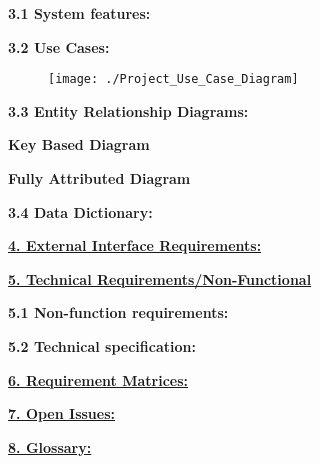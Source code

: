 \documentclass[12pt]{article}
\begin{document}
		\textbf{3.1 System features:} %
		\vspace{0.1in}
		
		
	\vspace{0.2in}
	
		\textbf{3.2 Use Cases:} %
		\vspace{0.1in}
			\begin{figure}[htbp] %
				\centering
				\texttt{[image: ./Project\_Use\_Case\_Diagram]}
			\end{figure}
		
		
		
	\vspace{0.2in}
	
		\textbf{3.3 Entity Relationship Diagrams:}
		\vspace{0.2in}
		

		\vspace{0.1in}

			\begin{center}
			\textbf{Key Based Diagram}
			\end{center}
		
		\vspace{0.3in}
		
		
		\begin{center}
			\textbf{Fully Attributed Diagram}
			\end{center}
		
		\vspace{0.3in}
		
		

		
	\vspace{0.1in}
	
		\textbf{3.4 Data Dictionary:}
		\vspace{0.1in}
		
		
	\vspace{0.5in}
	
	\textbf{\underline{4. External Interface Requirements:}}
	\vspace{0.2in}
	
	
	
	\vspace{0.5in}
	
	\textbf{\underline{5. Technical Requirements/Non-Functional}}
	\vspace{0.2in}
	
		\textbf{5.1 Non-function requirements:} %
		\vspace{0.1in}
				
		\textbf{5.2 Technical specification:} %
		\vspace{0.1in}
	
	\vspace{0.5in}
	
	\newpage
	\textbf{\underline{6. Requirement Matrices:}}
	\vspace{0.2in}
	
	
	
	\vspace{0.5in}
	
	\textbf{\underline{7. Open Issues:}}		
	\vspace{0.2in}
	
	
	
	\vspace{0.5in}
	
	\textbf{\underline{8. Glossary:}}
	\vspace{0.2in}
		
	
	\vspace{0.5in}
		
\end{document}
